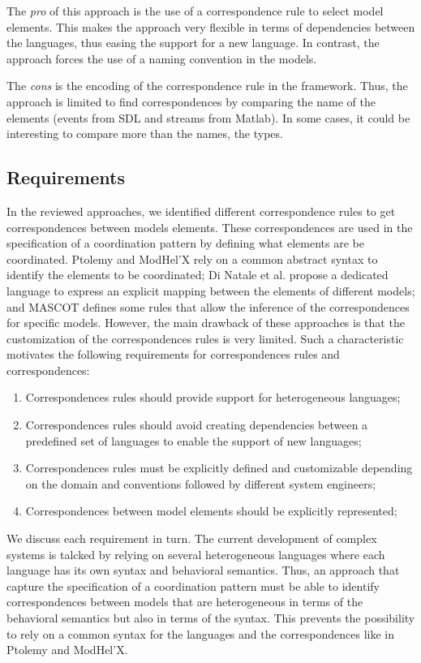 The \emph{pro} of this approach is the use of a correspondence rule to select model elements. This makes the approach very flexible in terms of dependencies between the languages, thus easing the support for a new language. In contrast, the approach forces the use of a naming convention in the models.     

The \emph{cons} is the encoding of the correspondence rule in the framework. Thus, the approach is limited to find correspondences by comparing the name of the elements (\ie events from SDL and streams from Matlab). In some cases, it could be interesting to compare more than the names, \eg the types. 


\subsection{Requirements}
In the reviewed approaches, we identified different correspondence rules to get correspondences between models elements. These correspondences are used in the specification of a coordination pattern by defining what elements are be coordinated. Ptolemy and ModHel'X rely on a common abstract syntax to identify the elements to be coordinated; Di Natale et al. propose a dedicated language to express an explicit mapping between the elements of different models; and MASCOT defines some rules that allow the inference of the correspondences for specific models. However, the main drawback of these approaches is that the customization of the correspondences rules is very limited. Such a characteristic motivates the following requirements for correspondences rules and correspondences:

\begin{enumerate}
	\item Correspondences rules should provide support for heterogeneous languages; 
	\item Correspondences rules should avoid creating dependencies between a predefined set of languages to enable the support of new languages;
	\item Correspondences rules must be explicitly defined and customizable depending on the domain and conventions followed by different system engineers;
	\item Correspondences between model elements should be explicitly represented;  
\end{enumerate}

We discuss each requirement in turn. The current development of complex systems is talcked by relying on several heterogeneous languages where each language has its own syntax and behavioral semantics. Thus, an approach that capture the specification of a coordination pattern must be able to identify correspondences between models that are heterogeneous in terms of the behavioral semantics but also in terms of the syntax. This prevents the possibility to rely on a common syntax for the languages and the correspondences like in Ptolemy and ModHel'X.


